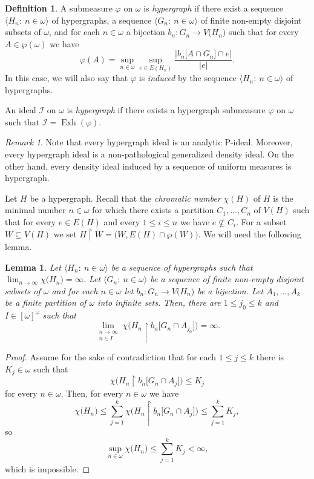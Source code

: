 \documentclass[a4paper,11pt,fleqn]{amsart}
\newtheorem{lemma}[theorem]{Lemma}
\theoremstyle{definition}
\newtheorem{definition}[theorem]{Definition}
\theoremstyle{remark}
\newtheorem{remark}[theorem]{Remark}
\numberwithin{equation}{section}
\newcommand{\N}{\mathbb{N}}
\newcommand{\iI}{\mathcal{I}}
\DeclareMathOperator{\exh}{Exh}
\newcommand{\rstr}{\restriction}
\newcommand{\sub}{\subseteq}
\newcommand{\seqn}[1]{\big\langle#1\colon\ n\io\big\rangle}
\newcommand{\ctblsub}[1]{\left[#1\right]^\omega}
\newcommand{\io}{\in\omega}%
\newcommand{\wo}{{\wp(\omega)}}%
\newcommand{\cso}{\ctblsub{\omega}}%
\begin{document}
\begin{definition}\label{def:hypergraph}
    A submeasure $\varphi$ on $\omega$ is \textit{hypergraph} if there exist a sequence $\seqn{H_n}$ of hypergraphs, a sequence $\seqn{G_n}$ of finite non-empty disjoint subsets of $\omega$, and for each $n\io$ a bijection $b_n\colon G_n\to V\big(H_n\big)$ such that for every $A\in\wo$ we have
    \[\varphi(A)=\sup_{n\io}\sup_{e\in E(H_n)}\frac{\big|b_n\big[A\cap G_n\big]\cap e\big|}{|e|}.\]
    In this case, we will also say that $\varphi$ is \textit{induced} by the sequence $\seqn{H_n}$ of hypergraphs.

    An ideal $\iI$ on $\omega$ is \textit{hypergraph} if there exists a hypergraph submeasure $\varphi$ on $\omega$ such that $\iI=\exh(\varphi)$.
\end{definition}

\begin{remark}\label{rmk:hypergraph}
Note that every hypergraph ideal is an analytic P-ideal. Moreover, every hypergraph ideal is a non-pathological generalized density ideal. On the other hand, every density ideal induced by a sequence of uniform measures is hypergraph.
\end{remark}

Let $H$ be a hypergraph. Recall that the \textit{chromatic number} $\chi(H)$ of $H$ is the minimal number $n\io$ for which there exists a partition $C_1,\ldots,C_n$ of $V(H)$ such that for every $e\in E(H)$ and every $1\le i\le n$ we have $e\not\sub C_i$. For a subset $W\sub V(H)$ we set $H\rstr W=\big(W,E(H)\cap\wp(W)\big)$. %
We will need the following lemma.
\begin{lemma}\label{lem:chromatic}
    Let $\seqn{H_n}$ be a sequence of hypergraphs such that $\lim_{n\to\infty}\chi\big(H_n\big)=\infty$. Let $\seqn{G_n}$ be a sequence of finite non-empty disjoint subsets of $\omega$ and for each $n\io$ let $b_n\colon G_n\to V\big(H_n\big)$ be a bijection.
    Let $A_1,\ldots,A_k$ be a finite partition of $\omega$ into infinite sets. Then, there are $1\le j_0\le k$ and $I\in\cso$ such that
    \[\lim_{\substack{n\to\infty\\n\in I}}\chi\Big(H_n\rstr b_n\big[G_n\cap A_{j_0}\big]\Big)=\infty.\]
\end{lemma}
\begin{proof}
    Assume for the sake of contradiction that for each $1\le j\le k$ there is $K_j\io$ such that
    \[\chi\Big(H_n\rstr b_n\big[G_n\cap A_j\big]\Big)\le K_j\]
    for every $n\io$. Then, for every $n\io$ we have
    \[\chi\big(H_n\big)\le\sum_{j=1}^k\chi\Big(H_n\rstr b_n\big[G_n\cap A_j\big]\Big)\le\sum_{j=1}^k K_j,\]
    so
    \[\sup_{n\io}\chi\big(H_n\big)\le\sum_{j=1}^k K_j<\infty,\]
    which is impossible.
\end{proof}
\end{document}
